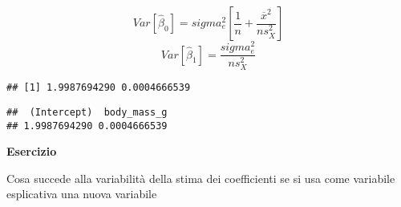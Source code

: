 \documentclass[
]{article}
\newenvironment{Shaded}{\begin{snugshade}}{\end{snugshade}}
\newcommand{\DecValTok}[1]{\textcolor[rgb]{0.00,0.00,0.81}{#1}}
\newcommand{\FunctionTok}[1]{\textcolor[rgb]{0.00,0.00,0.00}{#1}}
\newcommand{\NormalTok}[1]{#1}
\newcommand{\OtherTok}[1]{\textcolor[rgb]{0.56,0.35,0.01}{#1}}
\newcommand{\SpecialCharTok}[1]{\textcolor[rgb]{0.00,0.00,0.00}{#1}}
\begin{document}
\[Var[\widehat{\beta}_0]= sigma_e^2\left[\frac{1}{n} + \frac{\overline{x}^2}{n s^2_X}\right]\]
\[Var[\widehat{\beta}_1] = \frac{ sigma_e^2}{n s^2_X}\]

\begin{Shaded}
\end{Shaded}

\begin{verbatim}
## [1] 1.9987694290 0.0004666539
\end{verbatim}

\begin{Shaded}
\end{Shaded}

\begin{verbatim}
##  (Intercept)  body_mass_g 
## 1.9987694290 0.0004666539
\end{verbatim}

\textbf{Esercizio}

Cosa succede alla variabilità della stima dei coefficienti se si usa
come variabile esplicativa una nuova variabile

\begin{Shaded}
\end{Shaded}
\end{document}
